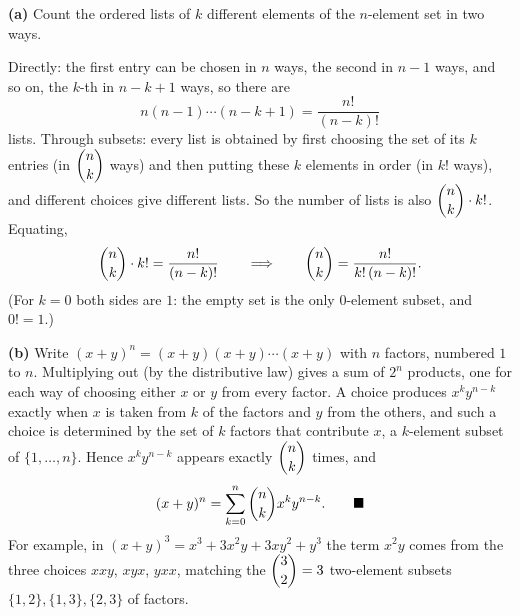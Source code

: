 \textbf{(a)} Count the ordered lists of $k$ different elements of the $n$-element set in two ways.

Directly: the first entry can be chosen in $n$ ways, the second in $n-1$ ways, and so on, the $k$-th in $n-k+1$ ways, so there are
\[
n(n-1)\cdots(n-k+1)=\dfrac{n!}{(n-k)!}
\]
lists. Through subsets: every list is obtained by first choosing the set of its $k$ entries (in $\dbinom nk$ ways) and then putting these $k$ elements in order (in $k!$ ways), and different choices give different lists. So the number of lists is also $\dbinom nk\cdot k!$. Equating,
\[
\dbinom nk\cdot k!=\dfrac{n!}{(n-k)!}\qquad\Longrightarrow\qquad\dbinom nk=\dfrac{n!}{k!\,(n-k)!}.
\]
(For $k=0$ both sides are $1$: the empty set is the only $0$-element subset, and $0!=1$.)

\textbf{(b)} Write $(x+y)^n=(x+y)(x+y)\cdots(x+y)$ with $n$ factors, numbered $1$ to $n$. Multiplying out (by the distributive law) gives a sum of $2^n$ products, one for each way of choosing either $x$ or $y$ from every factor. A choice produces $x^ky^{n-k}$ exactly when $x$ is taken from $k$ of the factors and $y$ from the others, and such a choice is determined by the set of $k$ factors that contribute $x$, a $k$-element subset of $\{1,\dots,n\}$. Hence $x^ky^{n-k}$ appears exactly $\dbinom nk$ times, and
\[
(x+y)^n=\sum_{k=0}^{n}\dbinom nk x^ky^{n-k}.\qquad\blacksquare
\]
For example, in $(x+y)^3=x^3+3x^2y+3xy^2+y^3$ the term $x^2y$ comes from the three choices $xxy$, $xyx$, $yxx$, matching the $\dbinom32=3$ two-element subsets $\{1,2\},\{1,3\},\{2,3\}$ of factors.

